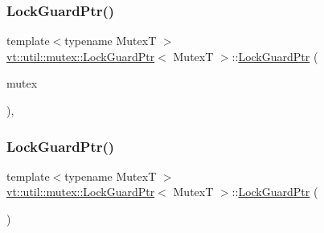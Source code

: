 \subsubsection{\texorpdfstring{Lock\+Guard\+Ptr()}{LockGuardPtr()}\hspace{0.1cm}{\footnotesize\ttfamily [1/2]}}
{\footnotesize\ttfamily template$<$typename MutexT $>$ \\
\hyperlink{structvt_1_1util_1_1mutex_1_1_lock_guard_ptr}{vt\+::util\+::mutex\+::\+Lock\+Guard\+Ptr}$<$ MutexT $>$\+::\hyperlink{structvt_1_1util_1_1mutex_1_1_lock_guard_ptr}{Lock\+Guard\+Ptr} (\begin{DoxyParamCaption}\item[{MutexT $\ast$}]{mutex }\end{DoxyParamCaption})\hspace{0.3cm}{\ttfamily [inline]}, {\ttfamily [explicit]}}

\mbox{\label{structvt_1_1util_1_1mutex_1_1_lock_guard_ptr_af12e24d099e69a582ceabd7cd4f77079}} 
\subsubsection{\texorpdfstring{Lock\+Guard\+Ptr()}{LockGuardPtr()}\hspace{0.1cm}{\footnotesize\ttfamily [2/2]}}
{\footnotesize\ttfamily template$<$typename MutexT $>$ \\
\hyperlink{structvt_1_1util_1_1mutex_1_1_lock_guard_ptr}{vt\+::util\+::mutex\+::\+Lock\+Guard\+Ptr}$<$ MutexT $>$\+::\hyperlink{structvt_1_1util_1_1mutex_1_1_lock_guard_ptr}{Lock\+Guard\+Ptr} (\begin{DoxyParamCaption}\item[{\hyperlink{structvt_1_1util_1_1mutex_1_1_lock_guard_ptr}{Lock\+Guard\+Ptr}$<$ MutexT $>$ const \&}]{ }\end{DoxyParamCaption})\hspace{0.3cm}{\ttfamily [delete]}}

\mbox{\label{structvt_1_1util_1_1mutex_1_1_lock_guard_ptr_af4304427f4783fc57e3fb889d4e64797}} 

